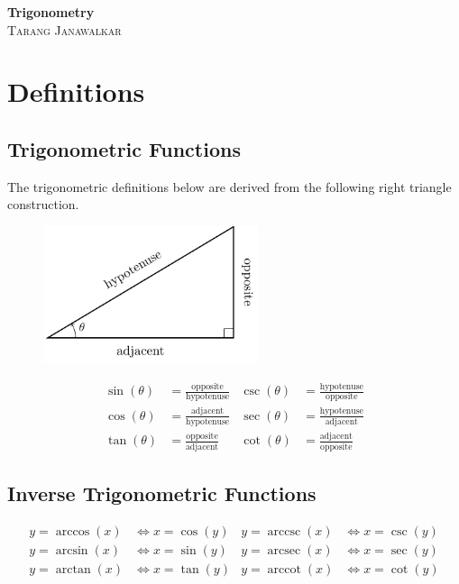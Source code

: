 \documentclass{article}
\author{Tarang Janawalkar}
\date{}
\DeclareMathOperator{\arccot}{arccot}
\DeclareMathOperator{\arcsec}{arcsec}
\DeclareMathOperator{\arccsc}{arccsc}
\newcommand{\docTitle}{Trigonometry}
\begin{document}
%
\begin{titlepage}
    \vspace*{\fill}
    \begin{center}
        \LARGE\textbf{\docTitle}\\[0.2in]
        \normalsize\textsc{Tarang Janawalkar}
    \end{center}
    \vspace*{\fill}
    \doclicenseThis
    \thispagestyle{empty}
\end{titlepage}
\newpage
%
\tableofcontents
\newpage
%
\renewcommand*{\arraystretch}{1.25}
\section{Definitions}
\subsection{Trigonometric Functions}
The trigonometric definitions below are derived from the following right
triangle construction.
\begin{figure}[H]
    \centering
    \includegraphics[height = 4cm, keepaspectratio = true]{figures/right-triangle.pdf}
\end{figure}
\begin{align*}
    \sin{\left( \theta \right)} & = \frac{\text{opposite}}{\text{hypotenuse}} & \csc{\left( \theta \right)} & = \frac{\text{hypotenuse}}{\text{opposite}} \\
    \cos{\left( \theta \right)} & = \frac{\text{adjacent}}{\text{hypotenuse}} & \sec{\left( \theta \right)} & = \frac{\text{hypotenuse}}{\text{adjacent}} \\
    \tan{\left( \theta \right)} & = \frac{\text{opposite}}{\text{adjacent}}   & \cot{\left( \theta \right)} & = \frac{\text{adjacent}}{\text{opposite}}
\end{align*}
\subsection{Inverse Trigonometric Functions}
\begin{align*}
    y = \arccos{\left( x \right)} & \iff x = \cos{\left( y \right)} & y = \arccsc{\left( x \right)} & \iff x = \csc{\left( y \right)} \\
    y = \arcsin{\left( x \right)} & \iff x = \sin{\left( y \right)} & y = \arcsec{\left( x \right)} & \iff x = \sec{\left( y \right)} \\
    y = \arctan{\left( x \right)} & \iff x = \tan{\left( y \right)} & y = \arccot{\left( x \right)} & \iff x = \cot{\left( y \right)}
\end{align*}
\end{document}
